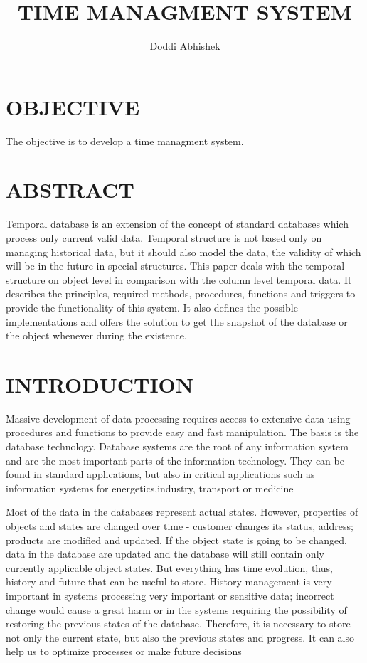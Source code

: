 \documentclass{article}
\title{TIME MANAGMENT SYSTEM}
\author{Doddi Abhishek}
\begin{document}
\maketitle

\section{OBJECTIVE}

The objective is to develop a time managment system.

\section{ABSTRACT}
Temporal database is an extension of the concept of standard databases which process only current valid data.
Temporal structure is not based only on managing historical data, but it should also model the data, the validity
of which will be in the future in special structures. This paper deals with the temporal structure on object level
in comparison with the column level temporal data. It describes the principles, required methods, procedures,
functions and triggers to provide the functionality of this system. It also defines the possible implementations and
offers the solution to get the snapshot of the database or the object whenever during the existence.

\section{INTRODUCTION}
Massive development of data processing requires access to extensive data using procedures and functions to provide
easy and fast manipulation. The basis is the database technology.
Database systems are the root of any information system and are the most important parts of the information technology.
They can be found in standard applications, but also in critical applications such as information systems for energetics,industry, transport or medicine

Most of the data in the databases represent actual states. However, properties of objects and states are changed over
time - customer changes its status, address; products are modified and updated. If the object state is going to be
changed, data in the database are updated and the database will still contain only currently applicable object states.
But everything has time evolution, thus, history and future that can be useful to store. History management is very
important in systems processing very important or sensitive data; incorrect change would cause a great harm or in the
systems requiring the possibility of restoring the previous states of the database. Therefore, it is necessary to store
not only the current state, but also the previous states and progress. It can also help us to optimize processes or make
future decisions
\end{document}
